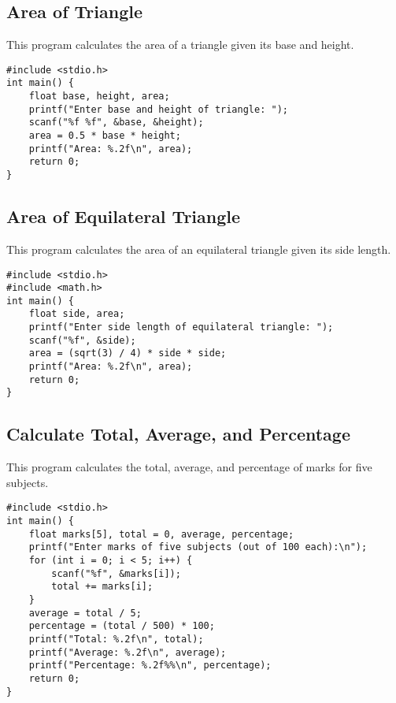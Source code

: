 \documentclass[a4paper,12pt]{article}
\begin{document}
\newpage

\subsection{Area of Triangle}
This program calculates the area of a triangle given its base and height.

\begin{lstlisting}[caption={Area of Triangle}]
#include <stdio.h>
int main() {
    float base, height, area;
    printf("Enter base and height of triangle: ");
    scanf("%f %f", &base, &height);
    area = 0.5 * base * height;
    printf("Area: %.2f\n", area);
    return 0;
}
\end{lstlisting}

\newpage

\subsection{Area of Equilateral Triangle}
This program calculates the area of an equilateral triangle given its side length.

\begin{lstlisting}[caption={Area of Equilateral Triangle}]
#include <stdio.h>
#include <math.h>
int main() {
    float side, area;
    printf("Enter side length of equilateral triangle: ");
    scanf("%f", &side);
    area = (sqrt(3) / 4) * side * side;
    printf("Area: %.2f\n", area);
    return 0;
}
\end{lstlisting}

\newpage

\subsection{Calculate Total, Average, and Percentage}
This program calculates the total, average, and percentage of marks for five subjects.

\begin{lstlisting}[caption={Calculate Total, Average, and Percentage}]
#include <stdio.h>
int main() {
    float marks[5], total = 0, average, percentage;
    printf("Enter marks of five subjects (out of 100 each):\n");
    for (int i = 0; i < 5; i++) {
        scanf("%f", &marks[i]);
        total += marks[i];
    }
    average = total / 5;
    percentage = (total / 500) * 100;
    printf("Total: %.2f\n", total);
    printf("Average: %.2f\n", average);
    printf("Percentage: %.2f%%\n", percentage);
    return 0;
}
\end{lstlisting}
\end{document}
